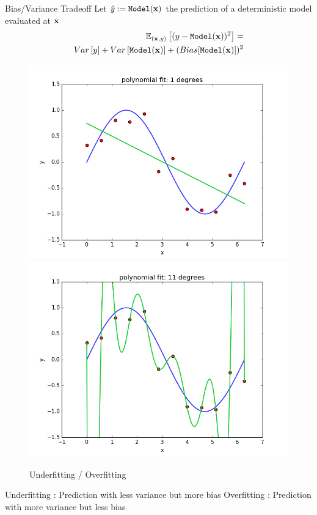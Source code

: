 \documentclass[handout,xcolor=pdftex,dvipsnames,table,mathserif]{beamer}
\begin{document}
\begin{frame}{Bias/Variance Tradeoff}
Let $\hat{y}:=\texttt{Model}(\mathbf{x})$ the prediction of a deterministic model evaluated at $\mathbf{x}$
\begin{eqnarray*}
\mathbb{E}_{(\mathbf{x},y)}\left [ (y-\texttt{Model}(\mathbf{x}))^ 2\right ] = \\ Var\left[y \right] + Var \left[ \texttt{Model}(\mathbf{x}) \right] + (Bias [\texttt{Model}(\mathbf{x})])^2
\end{eqnarray*}
\begin{figure}
\includegraphics[width=.45 \columnwidth]{../graphics/polyfit_degree_1}
\includegraphics[width=.45 \columnwidth]{../graphics/polyfit_degree_11}
\caption{Underfitting / Overfitting}
\end{figure}
Underfitting : Prediction with less variance but more bias
Overfitting : Prediction with more variance but less bias
\end{frame}
\end{document}
